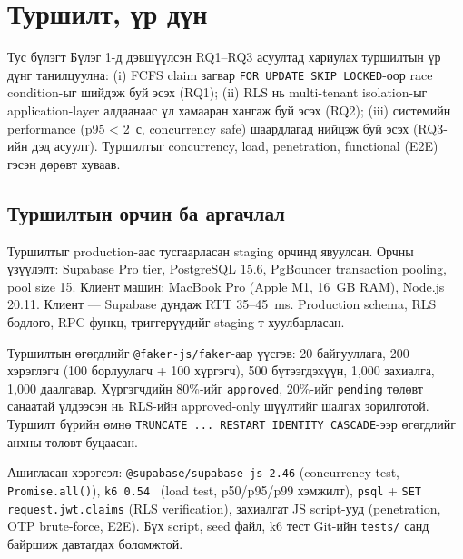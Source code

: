 
\section{Туршилт, үр дүн}
\label{sec:experiments}

Тус бүлэгт Бүлэг 1-д дэвшүүлсэн RQ1--RQ3 асуултад хариулах туршилтын үр дүнг танилцуулна: (i) FCFS claim загвар \texttt{FOR UPDATE SKIP LOCKED}-оор race condition-ыг шийдэж буй эсэх (RQ1); (ii) RLS нь multi-tenant isolation-ыг application-layer алдаанаас үл хамааран хангаж буй эсэх (RQ2); (iii) системийн performance (p95 < 2~с, concurrency safe) шаардлагад нийцэж буй эсэх (RQ3-ийн дэд асуулт). Туршилтыг concurrency, load, penetration, functional (E2E) гэсэн дөрөвт хуваав.

\subsection{Туршилтын орчин ба аргачлал}
\label{subsec:test_environment}

Туршилтыг production-аас тусгаарласан staging орчинд явуулсан. Орчны үзүүлэлт: Supabase Pro tier, PostgreSQL 15.6, PgBouncer transaction pooling, pool size 15. Клиент машин: MacBook Pro (Apple M1, 16~GB RAM), Node.js 20.11. Клиент — Supabase дундаж RTT 35--45~ms. Production schema, RLS бодлого, RPC функц, триггерүүдийг staging-т хуулбарласан.

Туршилтын өгөгдлийг \texttt{@faker-js/faker}-аар үүсгэв: 20 байгууллага, 200 хэрэглэгч (100 борлуулагч + 100 хүргэгч), 500 бүтээгдэхүүн, 1{,}000 захиалга, 1{,}000 даалгавар. Хүргэгчдийн 80\%-ийг \texttt{approved}, 20\%-ийг \texttt{pending} төлөвт санаатай үлдээсэн нь RLS-ийн approved-only шүүлтийг шалгах зорилготой. Туршилт бүрийн өмнө \texttt{TRUNCATE ... RESTART IDENTITY CASCADE}-ээр өгөгдлийг анхны төлөвт буцаасан.

Ашигласан хэрэгсэл: \texttt{@supabase/supabase-js 2.46} (concurrency test, \texttt{Promise.all()}), \texttt{k6 0.54}~\cite{k6docs} (load test, p50/p95/p99 хэмжилт), \texttt{psql} + \texttt{SET request.jwt.claims} (RLS verification), захиалгат JS script-ууд (penetration, OTP brute-force, E2E). Бүх script, seed файл, k6 тест Git-ийн \texttt{tests/} санд байршиж давтагдах боломжтой.

